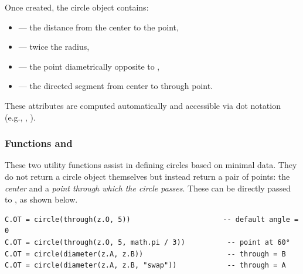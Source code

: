 Once created, the circle object contains:
\begin{itemize}
\item {} — the distance from the center to the point,
\item {} — twice the radius,
\item {} — the point diametrically opposite to ,
\item {} — the directed segment from center to through point.
\end{itemize}
These attributes are computed automatically and accessible via dot notation (e.g., , ).


\vspace{1em}

\begin{tkzexample}[latex=.5\textwidth]
\begin{center}
  \end{center}
\end{tkzexample}


\subsubsection{Functions  and }
\label{ssub:function_code_through_and_code_diameter}

These two utility functions assist in defining circles based on minimal data. They do not return a circle object themselves but instead return a pair of points: the \emph{center} and a \emph{point through which the circle passes}. These can be directly passed to , as shown below.

\begin{mybox}
\begin{verbatim}
C.OT = circle(through(z.O, 5))                      -- default angle = 0
C.OT = circle(through(z.O, 5, math.pi / 3))          -- point at 60°
C.OT = circle(diameter(z.A, z.B))                    -- through = B
C.OT = circle(diameter(z.A, z.B, "swap"))            -- through = A
\end{verbatim}
\end{mybox}

